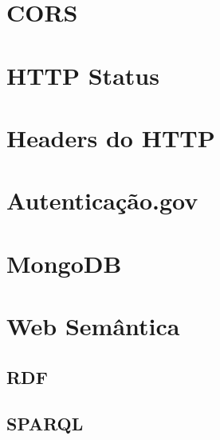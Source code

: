 \section{CORS}


\section{HTTP Status}

\section{Headers do HTTP}

\section{Autenticação.gov}
\cite{agov}


\section{MongoDB}
\cite{wdmongo}


\section{Web Semântica}
\cite{lsparql}

\subsection{RDF}
\cite{lsparql}

\subsection{SPARQL}
\cite{lsparql}

